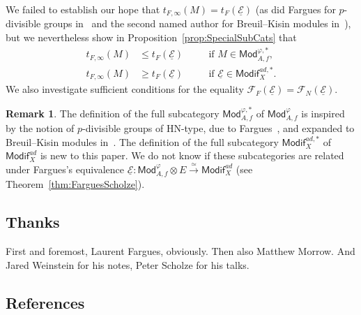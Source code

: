 \documentclass[11pt]{article}
\theoremstyle{definition}
\newtheorem{rema}[theo]{Remark}
\numberwithin{equation}{section}
\numberwithin{figure}{section}
\numberwithin{table}{section}
\newcommand{\Mod}{\mathsf{Mod}}
\newcommand{\Modif}{\mathsf{Modif}}
\begin{document}
We failed to establish our hope that $t_{F,\infty}(M)=t_{F}(\underline{\mathcal{E}})$ (as did Fargues for $p$-divisible groups in~\cite[Th\'eor\`eme~7]{Fa12} and the second named author for Breuil--Kisin modules in~\cite[Proposition~3.11]{Imp16}), but we nevertheless show in Proposition~\ref{prop:SpecialSubCats} that
\[
\begin{aligned}
t_{F,\infty}(M) & \leq t_{F}(\underline{\mathcal{E}})\quad && \text{if }M\in\Mod_{A,f}^{\varphi,\ast},\\
t_{F,\infty}(M) & \geq t_{F}(\underline{\mathcal{E}}) && \text{if }\underline{\mathcal{E}}\in\Modif_{X}^{ad,\ast}.
\end{aligned}
\]
We also investigate sufficient conditions for the equality $\mathcal{F}_{F}(\underline{\mathcal{E}})=\mathcal{F}_{N}(\underline{\mathcal{E}})$.

\begin{rema}
The definition of the full subcategory $\Mod_{A,f}^{\varphi,\ast}$ of $\Mod_{A,f}^{\varphi}$ is inspired by the notion of $p$-divisible groups of HN-type, due to Fargues~\cite{Fa12}, and expanded to Breuil--Kisin modules in~\cite{Imp16}. The definition of the full subcategory $\Modif_{X}^{ad,\ast}$ of $\Modif_{X}^{ad}$ is new to this paper. We do not know if these subcategories are related under Fargues's equivalence $\underline{\mathcal{E}}:\Mod_{A,f}^{\varphi}\otimes E\stackrel{\simeq}{\longrightarrow}\Modif_{X}^{ad}$ (see Theorem~\ref{thm:FarguesScholze}).
\end{rema}

\subsection{Thanks}

First and foremost, Laurent Fargues, obviously. Then also Matthew Morrow. And Jared Weinstein for his notes, Peter Scholze for his talks.

\subsection{References}
\end{document}

